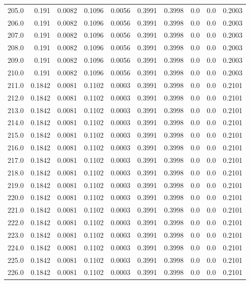\begin{longtable}{lrrrrrrrrr}
205.0 & 0.191 & 0.0082 & 0.1096 & 0.0056 & 0.3991 & 0.3998 & 0.0 & 0.0 & 0.2003 \\
206.0 & 0.191 & 0.0082 & 0.1096 & 0.0056 & 0.3991 & 0.3998 & 0.0 & 0.0 & 0.2003 \\
207.0 & 0.191 & 0.0082 & 0.1096 & 0.0056 & 0.3991 & 0.3998 & 0.0 & 0.0 & 0.2003 \\
208.0 & 0.191 & 0.0082 & 0.1096 & 0.0056 & 0.3991 & 0.3998 & 0.0 & 0.0 & 0.2003 \\
209.0 & 0.191 & 0.0082 & 0.1096 & 0.0056 & 0.3991 & 0.3998 & 0.0 & 0.0 & 0.2003 \\
210.0 & 0.191 & 0.0082 & 0.1096 & 0.0056 & 0.3991 & 0.3998 & 0.0 & 0.0 & 0.2003 \\
211.0 & 0.1842 & 0.0081 & 0.1102 & 0.0003 & 0.3991 & 0.3998 & 0.0 & 0.0 & 0.2101 \\
212.0 & 0.1842 & 0.0081 & 0.1102 & 0.0003 & 0.3991 & 0.3998 & 0.0 & 0.0 & 0.2101 \\
213.0 & 0.1842 & 0.0081 & 0.1102 & 0.0003 & 0.3991 & 0.3998 & 0.0 & 0.0 & 0.2101 \\
214.0 & 0.1842 & 0.0081 & 0.1102 & 0.0003 & 0.3991 & 0.3998 & 0.0 & 0.0 & 0.2101 \\
215.0 & 0.1842 & 0.0081 & 0.1102 & 0.0003 & 0.3991 & 0.3998 & 0.0 & 0.0 & 0.2101 \\
216.0 & 0.1842 & 0.0081 & 0.1102 & 0.0003 & 0.3991 & 0.3998 & 0.0 & 0.0 & 0.2101 \\
217.0 & 0.1842 & 0.0081 & 0.1102 & 0.0003 & 0.3991 & 0.3998 & 0.0 & 0.0 & 0.2101 \\
218.0 & 0.1842 & 0.0081 & 0.1102 & 0.0003 & 0.3991 & 0.3998 & 0.0 & 0.0 & 0.2101 \\
219.0 & 0.1842 & 0.0081 & 0.1102 & 0.0003 & 0.3991 & 0.3998 & 0.0 & 0.0 & 0.2101 \\
220.0 & 0.1842 & 0.0081 & 0.1102 & 0.0003 & 0.3991 & 0.3998 & 0.0 & 0.0 & 0.2101 \\
221.0 & 0.1842 & 0.0081 & 0.1102 & 0.0003 & 0.3991 & 0.3998 & 0.0 & 0.0 & 0.2101 \\
222.0 & 0.1842 & 0.0081 & 0.1102 & 0.0003 & 0.3991 & 0.3998 & 0.0 & 0.0 & 0.2101 \\
223.0 & 0.1842 & 0.0081 & 0.1102 & 0.0003 & 0.3991 & 0.3998 & 0.0 & 0.0 & 0.2101 \\
224.0 & 0.1842 & 0.0081 & 0.1102 & 0.0003 & 0.3991 & 0.3998 & 0.0 & 0.0 & 0.2101 \\
225.0 & 0.1842 & 0.0081 & 0.1102 & 0.0003 & 0.3991 & 0.3998 & 0.0 & 0.0 & 0.2101 \\
226.0 & 0.1842 & 0.0081 & 0.1102 & 0.0003 & 0.3991 & 0.3998 & 0.0 & 0.0 & 0.2101 \\

\end{longtable}
